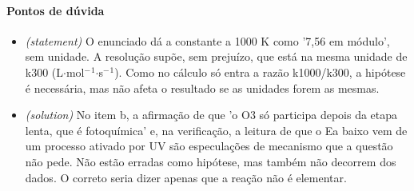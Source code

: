 \documentclass{article}%
\begin{document}
\paragraph{Pontos de dúvida}%
\begin{itemize}%
\item%
\textit{(statement)} O enunciado dá a constante a 1000 K como '7,56 em módulo', sem unidade. A resolução supõe, sem prejuízo, que está na mesma unidade de k300 (L$\cdot$mol$^{-}$$^{1}$$\cdot$s$^{-}$$^{1}$). Como no cálculo só entra a razão k1000/k300, a hipótese é necessária, mas não afeta o resultado se as unidades forem as mesmas.%
\item%
\textit{(solution)} No item b, a afirmação de que 'o O3 só participa depois da etapa lenta, que é fotoquímica' e, na verificação, a leitura de que o Ea baixo vem de um processo ativado por UV são especulações de mecanismo que a questão não pede. Não estão erradas como hipótese, mas também não decorrem dos dados. O correto seria dizer apenas que a reação não é elementar.%
\end{itemize}%
\end{document}
